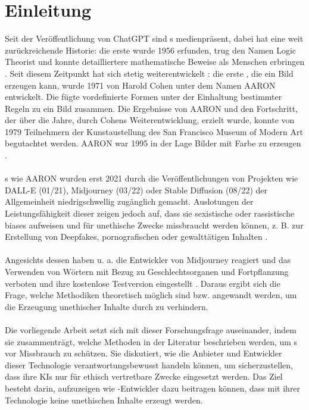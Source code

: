 \documentclass[hidelinks,12pt]{report}
\begin{document}
\chapter{Einleitung}
Seit der Veröffentlichung von ChatGPT sind s medienpräsent, dabei hat  eine weit zurückreichende Historie: die erste  wurde 1956 erfunden, trug den Namen Logic Theorist und konnte detailliertere mathematische Beweise als Menschen erbringen \cite{LogicTheorist}. Seit diesem Zeitpunkt hat sich  stetig weiterentwickelt \cite{HistoryAI}: die erste , die ein Bild erzeugen kann, wurde 1971 von Harold Cohen unter dem Namen AARON entwickelt. Die  fügte vordefinierte Formen unter der Einhaltung bestimmter Regeln zu ein Bild zusammen. Die Ergebnisse von AARON und den Fortschritt, der über die Jahre, durch Cohens Weiterentwicklung, erzielt wurde, konnte von 1979 Teilnehmern der Kunstaustellung des San Francisco Museum of Modern Art begutachtet werden. AARON war 1995 in der Lage Bilder mit Farbe zu erzeugen \cite{Garcia}.
\\\\
s wie AARON wurden erst 2021 durch die Veröffentlichungen von Projekten wie DALL-E (01/21), Midjourney (03/22) oder Stable Diffusion (08/22) der Allgemeinheit niedrigschwellig zugänglich gemacht. Auslotungen der Leistungsfähigkeit dieser  zeigen jedoch auf, dass sie sexistische oder rassistische \Gls{bias}es aufweisen \cite{Schmidt} und für unethische Zwecke missbraucht werden können, z. B. zur Erstellung von Deepfakes, pornografischen oder gewalttätigen Inhalten \cite{Hadero}.
\\\\
Angesichts dessen haben u. a. die Entwickler von Midjourney reagiert und das Verwenden von Wörtern mit Bezug zu Geschlechtsorganen und Fortpflanzung verboten \cite{Heikkilae} und ihre kostenlose Testversion eingestellt \cite{NelsonMidjourney}. Daraus ergibt sich die Frage, welche Methodiken theoretisch möglich sind bzw. angewandt werden, um die Erzeugung unethischer Inhalte durch  zu verhindern.
\\\\
Die vorliegende Arbeit setzt sich mit dieser Forschungsfrage auseinander, indem sie zusammenträgt, welche Methoden in der Literatur beschrieben werden, um s vor Missbrauch zu schützen. Sie diskutiert, wie die Anbieter und Entwickler dieser Technologie verantwortungsbewusst handeln können, um sicherzustellen, dass ihre KIs nur für ethisch vertretbare Zwecke eingesetzt werden. Das Ziel besteht darin, aufzuzeigen wie -Entwickler dazu beitragen können, dass mit ihrer Technologie keine unethischen Inhalte erzeugt werden.
\end{document}
